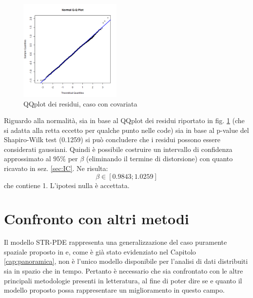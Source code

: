 \documentclass[a4paper,11pt,twoside,openright]{book}							%
\begin{document}
\begin{figure}[h]
	\centering
	\includegraphics[width=0.45\textwidth]{Immagini/DomCCovar/QQplot.png}   
   \caption{QQplot dei residui, caso con covariata}
	\label{fig:DomCcovar_qqplot}
\end{figure}
Riguardo alla normalità, sia in base al QQplot dei residui riportato in fig. \ref{fig:DomCcovar_qqplot} (che si adatta alla retta eccetto per qualche punto nelle code) sia in base al p-value del Shapiro-Wilk test (0.1259) si può concludere che i residui possono essere considerati gaussiani. Quindi è possibile costruire un intervallo di confidenza approssimato al $95\%$ per $\beta$ (eliminando il termine di distorsione) con quanto ricavato in sez. \ref{sec:IC}. Ne risulta:
$$
\beta \in [0.9843;1.0259]
$$
che contiene 1. L'ipotesi nulla è accettata.



\chapter{Confronto con altri metodi}
\label{cap:confronto}

Il modello STR-PDE rappresenta una generalizzazione del caso puramente spaziale proposto in \cite{art:sangalli} e, come è già stato evidenziato nel Capitolo \ref{cap:panoramica}, non è l'unico modello disponibile per l'analisi di dati distribuiti sia in spazio che in tempo. Pertanto è necessario che sia confrontato con le altre principali metodologie presenti in letteratura, al fine di poter dire se e quanto il modello proposto possa rappresentare un miglioramento in questo campo.
\end{document}
